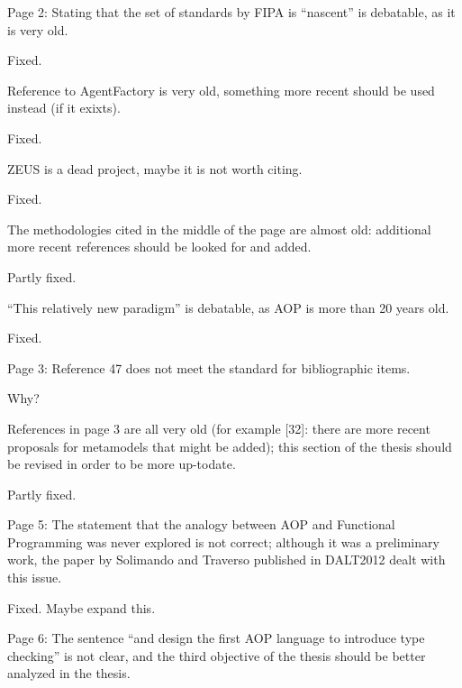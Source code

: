 \documentclass{article}
\newcommand{\todo}[1]{[\textcolor{red}{TODO}: #1]}
\newenvironment{them}{\noindent\begingroup\color{blue}}{\endgroup\par}
\begin{document}
\begin{them}

Page 2:
Stating that the set of standards by FIPA is “nascent” is debatable, as it is very old.
\end{them}
Fixed.

\begin{them}

Reference to AgentFactory is very old, something more recent should be used instead (if it exixts).
\end{them}
Fixed.

\begin{them}

ZEUS is a dead project, maybe it is not worth citing.
\end{them}
Fixed.

\begin{them}

The methodologies cited in the middle of the page are almost old: additional more recent references
should be looked for and added.
\end{them}
Partly fixed.

\begin{them}

“This relatively new paradigm” is debatable, as AOP is more than 20 years old.
\end{them}
Fixed.

\begin{them}

Page 3:
Reference 47 does not meet the standard for bibliographic items.
\end{them}
Why?

\begin{them}

References in page 3 are all very old (for example [32]: there are more recent proposals for metamodels
that might be added); this section of the thesis should be revised in order to be more up-todate.
\end{them}
Partly fixed.

\begin{them}

Page 5:
The statement that the analogy between AOP and Functional Programming was never explored is not
correct; although it was a preliminary work, the paper by Solimando and Traverso published in
DALT2012 dealt with this issue.
\end{them}
Fixed. Maybe expand this.

\begin{them}

Page 6:
The sentence “and design the first AOP language to introduce type checking” is not clear, and the
third objective of the thesis should be better analyzed in the thesis.
\end{them}
\todo{Make this clear}
\end{document}
